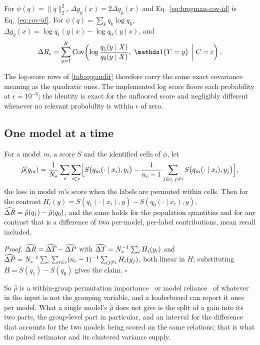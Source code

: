 \begin{corollary}\label{cor:bregman}
For $\psi(q)=\lVert q\rVert_2^2$, $\Delta g_y(x)=2\Delta q_y(x)$ and Eq.~\eqref{eq:bregman-cov-id} is Eq.~\eqref{eq:cov-id}. For $\psi(q)=\sum_kq_k\log q_k$, $\Delta g_y(x)=\log q_1(y\mid x)-\log q_0(y\mid x)$, and
\begin{equation}
\Delta R_c=\sum_{y=1}^K\operatorname{Cov}\!\left(\log\frac{q_1(y\mid X)}{q_0(y\mid X)},\ \ind\{Y=y\}\ \middle|\ C=c\right).
\label{eq:log-cov-id}
\end{equation}
\end{corollary}

\noindent The log-score rows of \cref{tab:sggaudit} therefore carry the same exact covariance
meaning as the quadratic ones. The implemented log score floors each probability at
$\epsilon=10^{-6}$; the identity is exact for the unfloored score and negligibly different
whenever no relevant probability is within $\epsilon$ of zero.

\subsection{One model at a time}
\begin{proposition}\label{prop:reliance}
For a model $m$, a score $S$ and the identified cells of $\phi$, let
\begin{equation}
\hat\rho(q_m)=\frac1{N_*}\sum_{c}\sum_{i\in c}\Bigl[S\bigl(q_m(\cdot\mid x_i),y_i\bigr)
-\frac1{n_c-1}\sum_{j\in c,\,j\ne i}S\bigl(q_m(\cdot\mid x_i),y_j\bigr)\Bigr],
\label{eq:reliance}
\end{equation}
the loss in model $m$'s score when the labels are permuted within cells. Then for the contrast
$H_i(y)=S(q_1(\cdot\mid x_i),y)-S(q_0(\cdot\mid x_i),y)$,
$\widehat{\Delta R}=\hat\rho(q_1)-\hat\rho(q_0)$, and the same holds for the population quantities and for
any contrast that is a difference of two per-model, per-label contributions, mean recall
included.
\end{proposition}

\noindent\emph{Proof.} $\widehat{\Delta R}=\widehat{\Delta T}-\widehat{\Delta P}$ with $\widehat{\Delta T}=N_*^{-1}\sum_iH_i(y_i)$ and
$\widehat{\Delta P}=N_*^{-1}\sum_c\sum_{i\in c}(n_c-1)^{-1}\sum_{j\ne i}H_i(y_j)$, both linear in $H$;
substituting $H=S(q_1)-S(q_0)$ gives the claim. $\square$

\noindent So $\hat\rho$ is a within-group permutation importance~\cite{strobl2008conditional}
or model reliance~\cite{fisher2019all} of whatever in the input is not the grouping
variable, and a leaderboard can report it once per model. What a single model's $\hat\rho$
does not give is the split of a gain into its two parts, the group-level part in particular,
and an interval for the difference that accounts for the two models being scored on the same
relations; that is what the paired estimator and its clustered variance supply.

